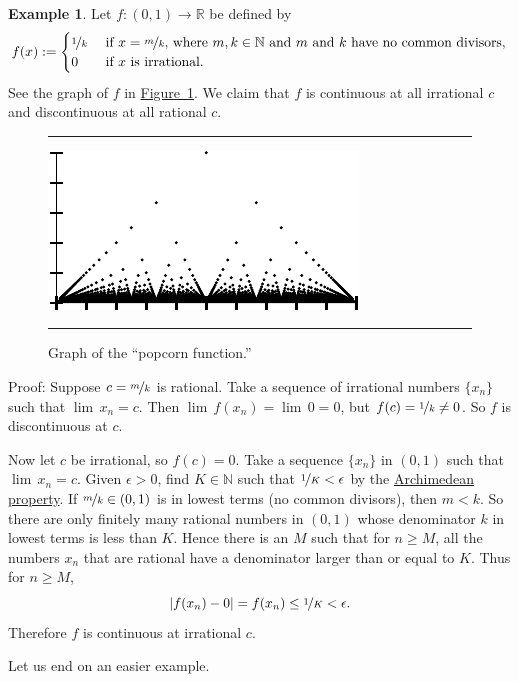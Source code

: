 \documentclass[12pt]{book}
\newenvironment{myfigureht}{%
\begin{figure}[h!t]
\noindent\rule{\textwidth}{0.4pt}\vspace{12pt}\par\centering}%
{\par\noindent\rule{\textwidth}{0.4pt}
\end{figure}}
\newcommand{\abs}[1]{\left\lvert {#1} \right\rvert}
\newcommand{\R}{{\mathbb{R}}}
\newcommand{\N}{{\mathbb{N}}}
\theoremstyle{plain}
\theoremstyle{remark}
\theoremstyle{definition}
\theoremstyle{exercise}
\theoremstyle{example}
\newtheorem{example}[thm]{Example}
\newcommand{\figureref}[1]{\hyperref[#1]{Figure~\ref*{#1}}}
\begin{document}
\begin{example} \label{popcornfunction:example}
Let $f \colon (0,1) \to \R$ be defined by
\begin{equation*}
f(x) := 
\begin{cases}
\nicefrac{1}{k} & \text{ if $x=\nicefrac{m}{k}$, where $m,k \in \N$
and $m$ and $k$ have no common divisors,} \\
0 & \text{ if $x$ is irrational}.
\end{cases}
\end{equation*}
See the graph of $f$
in \figureref{popcornfig}.
We claim that
$f$ is continuous at all irrational $c$ and 
discontinuous at all rational $c$.
\begin{myfigureht}
\includegraphics{figures/popcornfig}
\caption{Graph of the ``popcorn function.''\label{popcornfig}}
\end{myfigureht}

Proof:
Suppose $c = \nicefrac{m}{k}$ is rational.  Take a sequence of
irrational numbers $\{ x_n \}$ such that $\lim\, x_n = c$.  Then
$\lim\, f(x_n) = \lim \, 0 = 0$, but $f(c) = \nicefrac{1}{k} \not= 0$.  So $f$
is discontinuous at $c$.

Now let $c$ be irrational, so $f(c) = 0$.  Take a sequence 
$\{ x_n \}$ in $(0,1)$ such that $\lim\, x_n = c$.
Given $\epsilon > 0$, find $K \in \N$ such
that $\nicefrac{1}{K} < \epsilon$
by the \hyperref[thm:arch:i]{Archimedean property}.
If $\nicefrac{m}{k} \in (0,1)$ is in lowest terms
(no common divisors), then $m < k$.
So there are only finitely many rational numbers in $(0,1)$
whose denominator $k$ in lowest terms is less than $K$.  Hence
there is an $M$ such that for $n \geq M$, all the numbers $x_n$
that are rational
have a denominator larger than or equal to $K$.  Thus for $n \geq M$,
\begin{equation*}
\abs{f(x_n) - 0} = f(x_n) \leq \nicefrac{1}{K} < \epsilon .
\end{equation*}
Therefore $f$ is continuous at irrational $c$.
\end{example}

Let us end on an easier example.
\end{document}
